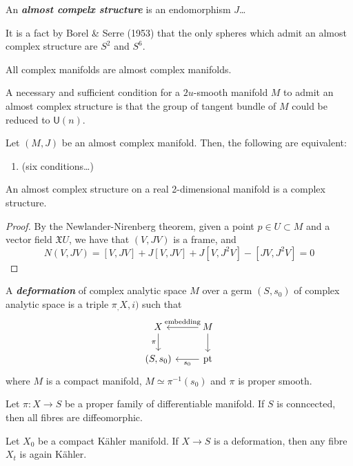 \begin{defn}
	An \textbf{\textit{almost compelx structure}} is an endomorphism $J$…
 \end{defn}
 \begin{remark}
 	It is a fact by Borel \& Serre (1953) that the only spheres which admit an almost complex structure are $S^2$ and $S^6$.
 \end{remark}
\begin{example}
	All complex manifolds are almost complex manifolds.
\end{example}
\begin{thm}
	A necessary and sufficient condition for a $2u$-smooth manifold $M$ to admit an almost complex structure is that the group of tangent bundle of $M$ could be reduced to $\mathsf{U}(n)$.
\end{thm}
\begin{thm}
	Let $(M,J)$ be an almost complex manifold. Then, the following are equivalent:
	\begin{enumerate}
		\item (six conditions…)
	\end{enumerate}
\end{thm}
\begin{prop}
	An almost complex structure on a real 2-dimensional manifold is a complex structure.
\end{prop}
\begin{proof}
	By the Newlander-Nirenberg theorem, given a point $p\in U\subset M$ and a vector field $\mathfrak{X}{U}$, we have that $(V,JV)$ is a frame, and
	\[N(V,JV)=[V,JV]+J[V,JV]+J[V,J^2V]-[JV,J^2V]=0\]
\end{proof}
\begin{defn}
	A \textbf{\textit{deformation}} of complex analytic space $M$ over a germ $(S,s_0)$ of complex analytic space is a triple $\pi_,X,i)$ such that
	\[\begin{tikzcd}
		X\arrow[d,"\pi",swap]&M\arrow[l,"\text{embedding}",swap]\arrow[d]\\
		(S,s_0)&\operatorname{p t}\arrow[l,"s_0"]
	\end{tikzcd}\]
	where $M$ is a compact manifold, $M\simeq\pi^{-1}(s_0)$ and $\pi$ is proper smooth.
\end{defn}
\begin{thm}[Ehresmann]
	Let $\pi:X\to S$ be a proper family of differentiable manifold. If $S$ is conncected, then all fibres are diffeomorphic.
\end{thm}
\begin{thm}[Kodaira]
	Let $X_0$ be a compact Kähler manifold. If $X\to S$ is a deformation, then any fibre $X_t$ is again Kähler.
\end{thm}
